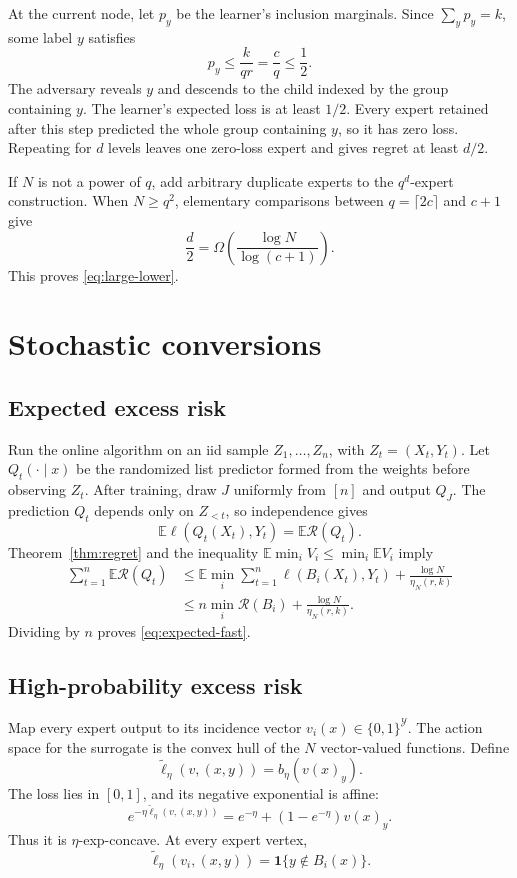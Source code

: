 \documentclass{article}
\theoremstyle{definition}
\theoremstyle{remark}
\newcommand{\E}{\mathbb E}
\newcommand{\cY}{\mathcal Y}
\newcommand{\1}{\mathbf 1}
\newcommand{\risk}{\mathcal R}
\begin{document}
At the current node, let \(p_y\) be the learner's inclusion marginals. Since \(\sum_yp_y=k\), some label \(y\) satisfies \[ p_y\le\frac{k}{qr}=\frac cq\le\frac12. \] The adversary reveals \(y\) and descends to the child indexed by the group containing \(y\). The learner's expected loss is at least \(1/2\). Every expert retained after this step predicted the whole group containing \(y\), so it has zero loss. Repeating for \(d\) levels leaves one zero-loss expert and gives regret at least \(d/2\).

If \(N\) is not a power of \(q\), add arbitrary duplicate experts to the \(q^d\)-expert construction. When \(N\ge q^2\), elementary comparisons between \(q=\lceil2c\rceil\) and \(c+1\) give \[ \frac d2 =\Omega\left(\frac{\log N}{\log(c+1)}\right). \] This proves \eqref{eq:large-lower}.

\section{Stochastic conversions}
\label{app:stochastic}

\subsection{Expected excess risk}

Run the online algorithm on an iid sample \(Z_1,\ldots,Z_n\), with \(Z_t=(X_t,Y_t)\). Let \(Q_t(\cdot\mid x)\) be the randomized list predictor formed from the weights before observing \(Z_t\). After training, draw \(J\) uniformly from \([n]\) and output \(Q_J\). The prediction \(Q_t\) depends only on \(Z_{<t}\), so independence gives \[ \E\ell(Q_t(X_t),Y_t)=\E\risk(Q_t). \] Theorem~\ref{thm:regret} and the inequality \(\E\min_i V_i\le\min_i\E V_i\) imply
\begin{align*}
\sum_{t=1}^n\E\risk(Q_t)
&\le
\E\min_i\sum_{t=1}^n\ell(B_i(X_t),Y_t)
+\frac{\log N}{\eta_N(r,k)}\\
&\le
n\min_i\risk(B_i)
+\frac{\log N}{\eta_N(r,k)}.
\end{align*}
Dividing by \(n\) proves \eqref{eq:expected-fast}.

\subsection{High-probability excess risk}

Map every expert output to its incidence vector \(v_i(x)\in\{0,1\}^{\cY}\). The action space for the surrogate is the convex hull of the \(N\) vector-valued functions. Define \[ \widetilde\ell_\eta(v,(x,y))=b_\eta(v(x)_y). \] The loss lies in \([0,1]\), and its negative exponential is affine: \[ e^{-\eta\widetilde\ell_\eta(v,(x,y))} =e^{-\eta}+(1-e^{-\eta})v(x)_y. \] Thus it is \(\eta\)-exp-concave. At every expert vertex, \[ \widetilde\ell_\eta(v_i,(x,y)) =\1\{y\notin B_i(x)\}. \]
\end{document}

